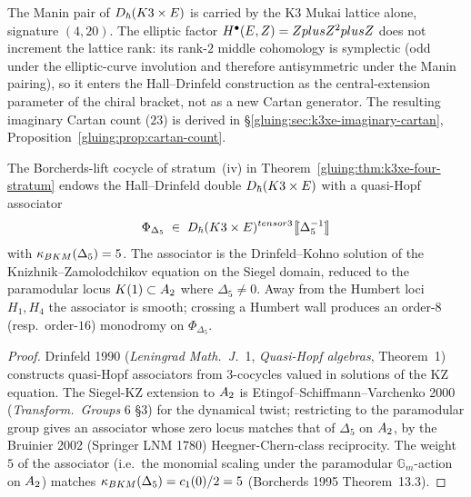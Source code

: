 \begin{remark}
\label{gluing:rem:signature-conventions}
The Manin pair of $D_\hbar(K3 \times E)$ is carried by the K3
Mukai lattice alone, signature $(4, 20)$. The elliptic factor
$H^\bullet(E, Z) = Z plus Z^2 plus Z$ does not increment
the lattice rank: its rank-$2$ middle cohomology is symplectic (odd
under the elliptic-curve involution and therefore antisymmetric
under the Manin pairing), so it enters the Hall--Drinfeld
construction as the central-extension parameter of the chiral
bracket, not as a new Cartan generator. The resulting imaginary
Cartan count ($23$) is derived in
\S\ref{gluing:sec:k3xe-imaginary-cartan},
Proposition~\ref{gluing:prop:cartan-count}.
\end{remark}

\begin{proposition}
\label{gluing:prop:Delta5-associator}
The Borcherds-lift cocycle of stratum~(iv) in
Theorem~\ref{gluing:thm:k3xe-four-stratum} endows the Hall--Drinfeld
double $D_\hbar(K3 \times E)$ with a quasi-Hopf associator
\[
 \Phi_{\Delta_5} \;\in\;
 D_\hbar(K3 \times E)^{tensor 3}
 \bigl[\![\Delta_5^{-1}]\!\bigr]
\]
with $\kappa_{BKM}(\Delta_5) = 5$. The associator is the Drinfeld--Kohno
solution of the Knizhnik--Zamolodchikov equation on the Siegel
domain, reduced to the paramodular locus $K(1) \subset A_2$
where $\Delta_5 \neq 0$. Away from the Humbert loci $H_1, H_4$ the
associator is smooth; crossing a Humbert wall produces an order-$8$
(resp.\ order-$16$) monodromy on $\Phi_{\Delta_5}$.
\end{proposition}

\begin{proof}
Drinfeld 1990 (\emph{Leningrad Math.\ J.}~1, \emph{Quasi-Hopf
algebras}, Theorem~1) constructs quasi-Hopf associators from
$3$-cocycles valued in solutions of the KZ equation. The Siegel-KZ
extension to $A_2$ is Etingof--Schiffmann--Varchenko
2000 (\emph{Transform.\ Groups} 6 \S 3) for the dynamical twist;
restricting to the paramodular group gives an associator whose
zero locus matches that of $\Delta_5$ on $A_2$, by
the Bruinier 2002 (Springer LNM 1780) Heegner-Chern-class
reciprocity. The weight $5$ of the associator (i.e.\ the monomial
scaling under the paramodular $\mathbb{G}_m$-action on
$A_2$) matches $\kappa_{BKM}(\Delta_5) = c_1(0)/2 = 5$
(Borcherds 1995 Theorem~13.3).
\end{proof}

